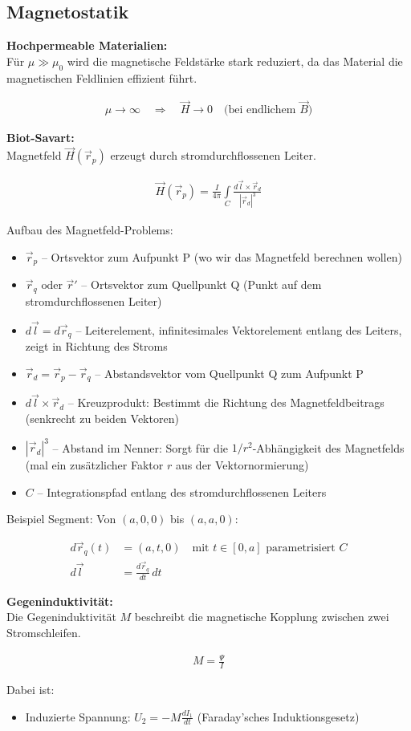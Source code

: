 \subsection{Magnetostatik}

\textbf{Hochpermeable Materialien:}\\
Für $\mu \gg \mu_0$ wird die magnetische Feldstärke stark reduziert, da das Material die magnetischen Feldlinien effizient führt.

\begin{align}
\mu \rightarrow \infty \quad \Rightarrow \quad \vec{H} \rightarrow 0 \quad \text{(bei endlichem } \vec{B}\text{)}
\end{align}




\textbf{Biot-Savart:}\\
Magnetfeld $\vec{H}(\vec{r}_p)$ erzeugt durch stromdurchflossenen Leiter.

\begin{align}
\vec{H}(\vec{r}_p) = \frac{I}{4\pi} \int\limits_C \frac{d\vec{l} \times \vec{r}_d}{|\vec{r}_d|^3}
\end{align}


Aufbau des Magnetfeld-Problems:
\begin{itemize}
\item $\vec{r}_p$ -- Ortsvektor zum Aufpunkt P (wo wir das Magnetfeld berechnen wollen)
\item $\vec{r}_q \text{ oder }\vec{r}'$ -- Ortsvektor zum Quellpunkt Q (Punkt auf dem stromdurchflossenen Leiter)
\item $d\vec{l} = d\vec{r}_q$ -- Leiterelement, infinitesimales Vektorelement entlang des Leiters, zeigt in Richtung des Stroms
\item $\vec{r}_d = \vec{r}_p - \vec{r}_q$ -- Abstandsvektor vom Quellpunkt Q zum Aufpunkt P
\item $d\vec{l} \times \vec{r}_d$ -- Kreuzprodukt: Bestimmt die Richtung des Magnetfeldbeitrags (senkrecht zu beiden Vektoren)
\item $|\vec{r}_d|^3$ -- Abstand im Nenner: Sorgt für die $1/r^2$-Abhängigkeit des Magnetfelds (mal ein zusätzlicher Faktor $r$ aus der Vektornormierung)
\item $C$ -- Integrationspfad entlang des stromdurchflossenen Leiters
\end{itemize}


Beispiel Segment: Von $(a,0,0)$ bis $(a,a,0)$:

\begin{align}
d\vec{r}_q(t) &= (a, t, 0) \quad \text{mit } t \in [0,a] \text{ parametrisiert } C \\
d\vec{l} &= \frac{d\vec{r}_q}{dt} \, dt
\end{align}







\textbf{Gegeninduktivität:}\\
Die Gegeninduktivität $M$ beschreibt die magnetische Kopplung zwischen zwei Stromschleifen.

\begin{align}
M = \frac{\Psi}{I}
\end{align}

Dabei ist:
\begin{itemize}
\item Induzierte Spannung: $U_2 = -M \frac{dI_1}{dt}$ (Faraday'sches Induktionsgesetz)
\end{itemize}
